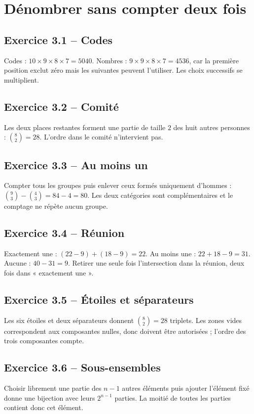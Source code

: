 \chapter{Dénombrer sans compter deux fois}
\section*{Exercice 3.1 -- Codes}
Codes : $10\times9\times8\times7=5040$. Nombres : $9\times9\times8\times7=4536$, car la première position exclut zéro mais les suivantes peuvent l'utiliser. Les choix successifs se multiplient.

\section*{Exercice 3.2 -- Comité}
Les deux places restantes forment une partie de taille $2$ des huit autres personnes : $\binom82=28$. L'ordre dans le comité n'intervient pas.

\section*{Exercice 3.3 -- Au moins un}
Compter tous les groupes puis enlever ceux formés uniquement d'hommes : $\binom93-\binom43=84-4=80$. Les deux catégories sont complémentaires et le comptage ne répète aucun groupe.

\section*{Exercice 3.4 -- Réunion}
Exactement une : $(22-9)+(18-9)=22$. Au moins une : $22+18-9=31$. Aucune : $40-31=9$. Retirer une seule fois l'intersection dans la réunion, deux fois dans « exactement une ».

\section*{Exercice 3.5 -- Étoiles et séparateurs}
Les six étoiles et deux séparateurs donnent $\binom82=28$ triplets. Les zones vides correspondent aux composantes nulles, donc doivent être autorisées ; l'ordre des trois composantes compte.

\section*{Exercice 3.6 -- Sous-ensembles}
Choisir librement une partie des $n-1$ autres éléments puis ajouter l'élément fixé donne une bijection avec leurs $2^{n-1}$ parties. La moitié de toutes les parties contient donc cet élément.
